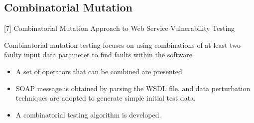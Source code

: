 \documentclass[10pt]{beamer}
\begin{document}
\subsection{Combinatorial Mutation}
\begin{frame}{[7] Combinatorial Mutation Approach to Web Service Vulnerability Testing }

Combinatorial mutation
testing focuses on using combinations of at least two faulty
input data parameter to find faults within the software
\begin{itemize}
\item A set of operators that can be combined are presented
\item SOAP message is obtained by parsing the WSDL file, and data perturbation techniques are adopted to generate simple initial test data.
\item A combinatorial testing algorithm is developed.
\end{itemize}

\end{frame}
%
\end{document}
